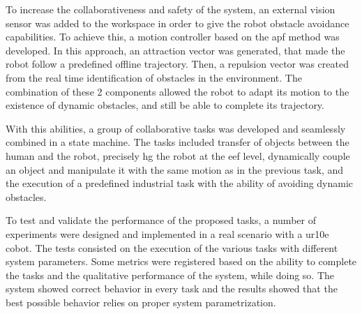 \par To increase the collaborativeness and safety of the system, an external vision sensor was added to the workspace in order to give the robot obstacle avoidance capabilities. To achieve this, a motion controller based on the \ac{apf} method was developed. In this approach, an attraction vector was generated, that made the robot follow a predefined offline trajectory. Then, a repulsion vector was created from the real time identification of obstacles in the environment. The combination of these 2 components allowed the robot to adapt its motion to the existence of dynamic obstacles, and still be able to complete its trajectory.

\par With this abilities, a group of collaborative tasks was developed and seamlessly combined in a state machine. The tasks included transfer of objects between the human and the robot, precisely \ac{hg} the robot at the \ac{eef} level, dynamically couple an object and manipulate it with the same motion as in the previous task, and the execution of a predefined industrial task with the ability of avoiding dynamic obstacles.

\par To test and validate the performance of the proposed tasks, a number of experiments were designed and implemented in a real scenario with a \ac{ur10e} cobot. The tests consisted on the execution of the various tasks with different system parameters. Some metrics were registered based on the ability to complete the tasks and the qualitative performance of the system, while doing so. The system showed correct behavior in every task and the results showed that the best possible behavior relies on proper system parametrization.

